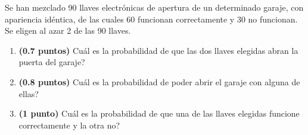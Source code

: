 
Se han mezclado 90 llaves electrónicas de apertura de un determinado
garaje, con apariencia idéntica, de las cuales 60 funcionan correctamente
y 30 no funcionan. Se eligen al azar 2 de las 90 llaves.
\begin{enumerate}[label=\alph*)]
  \item \textbf{(0.7 puntos)} \textquestiondown{}Cuál es la probabilidad de
  que las dos llaves elegidas abran la puerta del garaje?
  \item \textbf{(0.8 puntos)} \textquestiondown{}Cuál es la probabilidad de
  poder abrir el garaje con alguna de ellas?
  \item \textbf{(1 punto)} \textquestiondown{}Cuál es la probabilidad de que
  una de las llaves elegidas funcione correctamente y la otra no?
\end{enumerate}
